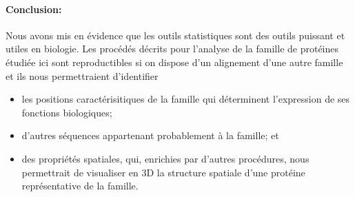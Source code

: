 \documentclass[a4paper, french]{article}
\begin{document}
\hspace{1in}
\paragraph{Conclusion:}
Nous avons mis en \'evidence que les outils statistiques sont des outils
puissant et utiles en biologie. Les proc\'ed\'es d\'ecrits pour
l'analyse de la famille de prot\'eines \'etudi\'ee ici sont reproductibles si
on dispose d'un alignement d'une autre famille et ils nous permettraient
d'identifier
\vskip 1mm
\begin{itemize}
    \item les positions caract\'erisitiques de la famille qui d\'eterminent
        l'expression de ses fonctions biologiques;
        \vskip 1mm
    \item d'autres s\'equences appartenant probablement \`a la famille; et
        \vskip 1mm
    \item des propri\'et\'es spatiales, qui, enrichies par d'autres
        proc\'edures, nous permettrait de
        visualiser en 3D la structure spatiale d'une prot\'eine
        repr\'esentative de la famille.
\end{itemize}
\end{document}
